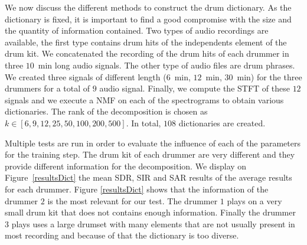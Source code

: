 
We now discuss the different methods to construct the drum dictionary. As the dictionary is fixed, it is important to find a good compromise with the size and the quantity of information contained. 
Two types of audio recordings are available, the first type contains drum hits of the independents element of the drum kit. We concatenated the recording of the drum hits of each drummer in three $10$~min long audio signals. The other type of audio files are drum phrases. We created three signals of different length ($6$~min, $12$~min, $30$~min) for the three drummers for a total of $9$ audio signal. 
Finally, we compute the STFT of these $12$ signals and we execute a NMF on each of the spectrograms to obtain various dictionaries. The rank of the decomposition is chosen as $k \in [6,9,12,25,50,100,200,500]$. In total, $108$ dictionaries are created. 

Multiple tests are run in order to evaluate the influence of each of the parameters for the training step. The drum kit of each drummer are very different and they provide different information for the decomposition. We display on Figure~\ref{resultsDict} the mean SDR, SIR and SAR results of the average results for each drummer. Figure \ref{resultsDict} shows that the information of the drummer $2$ is the most relevant for our test. The drummer $1$ plays on a very small drum kit that does not contains enough information. Finally the drummer $3$ plays uses a large drumset with many elements that are not usually present in most recording and because of that the dictionary is too diverse.

